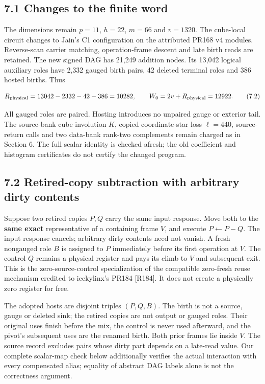 \documentclass[
  11pt,
]{article}
\begin{document}
\subsection{7.1 Changes to the finite
word}\label{changes-to-the-finite-word}

The dimensions remain \(p=11\), \(h=22\), \(m=66\) and \(v=1320\). The
cube-local circuit changes to Jain's C1 configuration on the attributed
PR168 v4 modules. Reverse-scan carrier matching, operation-frame descent
and late birth reads are retained. The new signed DAG has 21,249
addition nodes. Its 13,042 logical auxiliary roles have 2,332 gauged
birth pairs, 42 deleted terminal roles and 386 hosted births. Thus

\[
R_{\rm physical}=13042-2332-42-386=10282,
\qquad W_0=2v+R_{\rm physical}=12922.
\tag{7.2}
\]

All gauged roles are paired. Hosting introduces no unpaired gauge or
exterior tail. The source-bank cube involution \(K\), copied
coordinate-star loss \(\ell=440\), source-return calls and two data-bank
rank-two complements remain charged as in Section 6. The full scalar
identity is checked afresh; the old coefficient and histogram
certificates do not certify the changed program.

\subsection{7.2 Retired-copy subtraction with arbitrary dirty
contents}\label{retired-copy-subtraction-with-arbitrary-dirty-contents}

Suppose two retired copies \(P,Q\) carry the same input response. Move
both to the \textbf{same exact} representative of a containing frame
\(V\), and execute \(P\leftarrow P-Q\). The input response cancels;
arbitrary dirty contents need not vanish. A fresh nongauged role \(B\)
is assigned to \(P\) immediately before its first operation at \(V\).
The control \(Q\) remains a physical register and pays its climb to
\(V\) and subsequent exit. This is the zero-source-control
specialization of the compatible zero-fresh reuse mechanism credited to
icekylinx's PR184 {[}R184{]}. It does not create a physically zero
register for free.

The adopted hosts are disjoint triples \((P,Q,B)\). The birth is not a
source, gauge or deleted sink; the retired copies are not output or
gauged roles. Their original uses finish before the mix, the control is
never used afterward, and the pivot's subsequent uses are the renamed
birth. Both prior frames lie inside \(V\). The source record excludes
pairs whose dirty part depends on a late-read value. Our complete
scalar-map check below additionally verifies the actual interaction with
every compensated alias; equality of abstract DAG labels alone is not
the correctness argument.
\end{document}

